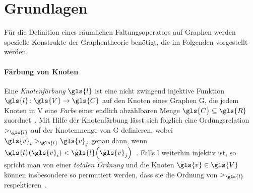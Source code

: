 \section{Grundlagen}
\label{raeumliche_grundlagen}

Für die Definition eines räumlichen Faltungsoperators auf Graphen werden spezielle Konstrukte der Graphentheorie benötigt, die im Folgenden vorgestellt werden.

\paragraph{Färbung von Knoten}
\label{faerbung_von_knoten}

Eine \emph{Knotenfärbung} $\gls{l}$ ist eine nicht zwingend injektive Funktion $\gls{l} \colon \gls{V} \to \gls{C}$ auf den Knoten eines Graphen \gls{G}, die jedem Knoten in \gls{V} eine \emph{Farbe} einer endlich abzählbaren Menge $\gls{C} \subseteq \gls{R}$ zuordnet~\cite{patchy}.
Mit Hilfe der Knotenfärbung lässt sich folglich eine Ordungsrelation $>_{\gls{l}}$ auf der Knotenmenge von \gls{G} definieren, wobei $\gls{v}_i >_{\gls{l}} \gls{v}_j$ genau dann, wenn $\gls{l}\left(\gls{v}_i\right) < \gls{l}\left(\gls{v}_j\right)$~\cite{patchy}.
Falls \gls{l} weiterhin injektiv ist, so spricht man von einer \emph{totalen Ordnung} und die Knoten $\gls{v} \in \gls{V}$ können insbesondere so permutiert werden, dass sie die Ordnung von $>_{\gls{l}}$ respektieren~\cite{patchy}.

